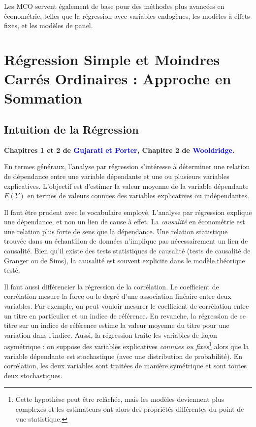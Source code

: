 \documentclass[14pt]{extarticle} %
\newcommand{\livre}[1]{\textcolor{blue}{#1}}
\begin{document}
Les MCO servent également de base pour des méthodes plus avancées en économétrie, telles que la régression avec variables endogènes, les modèles à effets fixes, et les modèles de panel.

\section{Régression Simple et Moindres Carrés Ordinaires : Approche en Sommation}

\subsection{Intuition de la Régression}
\textbf{Chapitres 1 et 2 de \livre{Gujarati et Porter}, Chapitre 2 de \livre{Wooldridge}.}

En termes généraux, l’analyse par régression s’intéresse à déterminer une relation de dépendance entre une variable dépendante et une ou plusieurs variables explicatives. L’objectif est d’estimer la valeur moyenne de la variable dépendante \( E(Y) \) en termes de valeurs connues des variables explicatives ou indépendantes.

Il faut être prudent avec le vocabulaire employé. L’analyse par régression explique une dépendance, et non un lien de cause à effet. La \emph{causalité} en économétrie est une relation plus forte de sens que la dépendance. Une relation statistique trouvée dans un échantillon de données n’implique pas nécessairement un lien de causalité. Bien qu’il existe des tests statistiques de causalité (tests de causalité de Granger ou de Sims), la causalité est souvent explicite dans le modèle théorique testé.

Il faut aussi différencier la régression de la corrélation. Le coefficient de corrélation mesure la force ou le degré d’une association linéaire entre deux variables. Par exemple, on peut vouloir mesurer le coefficient de corrélation entre un titre en particulier et un indice de référence. En revanche, la régression de ce titre sur un indice de référence estime la valeur moyenne du titre pour une variation dans l’indice. Aussi, la régression traite les variables de façon asymétrique : on suppose des variables explicatives \emph{connues ou fixes}\footnote{Cette hypothèse peut être relâchée, mais les modèles deviennent plus complexes et les estimateurs ont alors des propriétés différentes du point de vue statistique.} alors que la variable dépendante est stochastique (avec une distribution de probabilité). En corrélation, les deux variables sont traitées de manière symétrique et sont toutes deux stochastiques.
\end{document}
